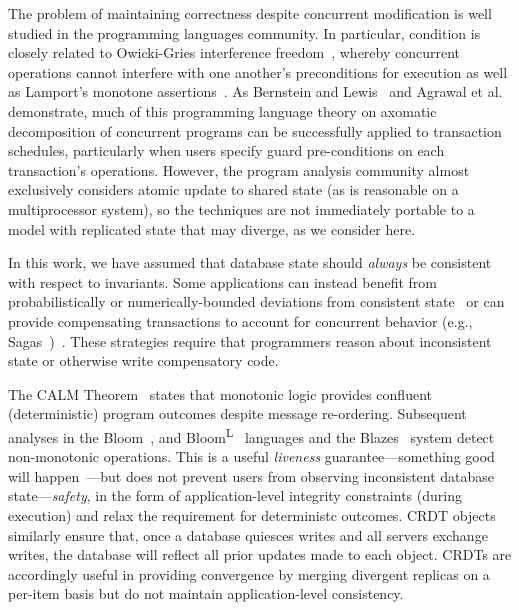  The problem of maintaining correctness
despite concurrent modification is well studied in the programming
languages community. In particular, \iconfluence condition is closely
related to Owicki-Gries interference
  freedom~\cite{owickigries}, whereby concurrent operations cannot
interfere with one another's preconditions for execution as well as
Lamport's monotone assertions~\cite{lamport-safety}. As
Bernstein and Lewis~\cite{decomp-semantics} and Agrawal et
al.~\cite{agarwal-consistency} demonstrate, much of this programming
language theory on axomatic decomposition of concurrent programs can
be successfully applied to transaction schedules, particularly when
users specify guard pre-conditions on each transaction's
operations. However, the program analysis community almost exclusively
considers atomic update to shared state (as is reasonable on a
multiprocessor system), so the techniques are not immediately portable
to a model with replicated state that may diverge, as we consider
here.

 In this work, we have assumed that
database state should \textit{always} be consistent with respect to
invariants. Some applications can instead benefit from
probabilistically or numerically-bounded deviations from consistent
state~\cite{epsilon-divergence} or can provide compensating
transactions to account for concurrent behavior (e.g.,
Sagas~\cite{sagas})~\cite{ic-survey,ic-survey-two}. These strategies
require that programmers reason about inconsistent state or otherwise
write compensatory code.

 The CALM
Theorem~\cite{ameloot-calm} states that monotonic logic provides
confluent (deterministic) program outcomes despite message
re-ordering. Subsequent analyses in the Bloom~\cite{calm}, and
Bloom\textsuperscript{L}~\cite{blooml} languages and the
Blazes~\cite{blazes} system detect non-monotonic operations. This is a
useful \textit{liveness} guarantee---something good will
happen~\cite{lamport-safety}---but does not prevent users from
observing inconsistent database state---\textit{safety}, in the form
of application-level integrity constraints (during execution) and
relax the requirement for deterministc outcomes. CRDT
objects~\cite{crdt} similarly ensure that, once a database quiesces
writes and all servers exchange writes, the database will reflect all
prior updates made to each object. CRDTs are accordingly useful in
providing convergence by merging divergent replicas on a per-item
basis but do not maintain application-level consistency.

